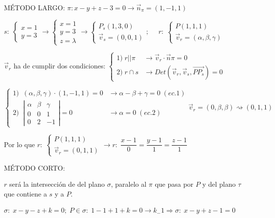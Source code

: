 \begin{proofw}\renewcommand{\qedsymbol}{$\diamond$}

MÉTODO LARGO: $\pi: x-y+z-3=0 \to \vec n_{\pi}=(1,-1,1)$

\noindent $s:\;   \begin{cases} x=1\\y=3 \end{cases} \to \begin{cases} x=1\\y=3\\ z=\lambda \end{cases} \to \begin{cases} P_s(1,3,0) \\ \vec v_s=(0,0,1) \end{cases}; \quad $ 
$r:\; \begin{cases} P(1,1,1) \\ \vec v_r=(\alpha,\beta,\gamma) \end{cases}$ 

\noindent $\vec v_r$ ha de cumplir dos condiciones: $\begin{cases} 1)\; r||\pi &\to \vec v_r\cdot \vec n{\pi}=0 \\  2)\; r\cap s &\to Det(\vec v_r, \vec v_s, \overrightarrow{PP_s})=0 \end{cases}$

\noindent $\begin{cases}
1)\; \; (\alpha,\beta,\gamma) \cdot (1,-1,1)=0 &\to \alpha-\beta+\gamma=0\; (ec.1)
\\
2)\;\; \left| \begin{matrix} \alpha&\beta&\gamma \\ 0&0&1\\0&2&-1 \end{matrix} \right|=0 &\to \alpha=0 \; (ec.2) 
\end{cases} \vec v_r=(0,\beta,\beta)\rightsquigarrow (0,1,1)$

\noindent Por lo que $r:\; \begin{cases} P(1,1,1) \\ \vec v_r=(0,1,1) \end{cases} \rightarrow r:\; \dfrac{x-1}{0}=\dfrac{y-1}{1}=\dfrac{z-1}{1}$


\noindent MÉTODO CORTO:

\noindent $r$ será la intersección de del plano $\sigma$, paralelo al $\pi$ que pasa por $P$ y del plano $\tau$ que contiene a $s$ y a $P$.

\noindent $\sigma:\; x-y-z+k=0;\; P\in \sigma:\; 1-1+1+k=0 \to k_-1 \Rightarrow \sigma:\; x-y+z-1=0$


\end{proofw}
